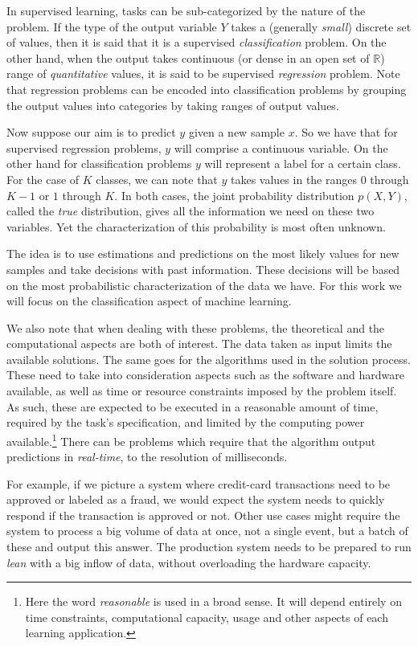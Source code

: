 In supervised learning, tasks can be sub-categorized by the nature of the problem.
If the type of the output variable $Y$ takes a (generally \textit{small}) discrete set of values, then it is said that it is a supervised \textit{classification} problem.
On the other hand, when the output takes continuous (or dense in an open set of $\mathbb{R}$) range of \textit{quantitative} values, it is said to be supervised \textit{regression} problem.
Note that regression problems can be encoded into classification problems by grouping the output values into categories by taking ranges of output values.

Now suppose our aim is to predict $y$ given a new sample $x$.
So we have that for supervised regression problems, $y$ will comprise a continuous variable.
On the other hand for classification problems $y$ will represent a label for a certain class.
For the case of $K$ classes, we can note that $y$ takes values in the ranges $0$ through $K-1$ or $1$ through $K$.
In both cases, the joint probability distribution $p(X, Y)$, called the \textit{true} distribution, gives all the information we need on these two variables.
Yet the characterization of this probability is most often unknown.

The idea is to use estimations and predictions on the most likely values for new samples and take decisions with past information.
These decisions will be based on the most probabilistic characterization of the data we have.
For this work we will focus on the classification aspect of machine learning.

We also note that when dealing with these problems, the theoretical and the computational aspects are both of interest.
The data taken as input limits the available solutions.
The same goes for the algorithms used in the solution process.
These need to take into consideration aspects such as the software and hardware available, as well as time or resource constraints imposed by the problem itself.
As such, these are expected to be executed in a reasonable amount of time, required by the task's specification, and limited by the computing power available.\footnote{Here the word \textit{reasonable} is used in a broad sense.
It will depend entirely on time constraints, computational capacity, usage and other aspects of each learning application.} There can be problems which require that the algorithm output predictions in \textit{real-time}, to the resolution of milliseconds.

For example, if we picture a system where credit-card transactions need to be approved or labeled as a fraud, we would expect the system needs to quickly respond if the transaction is approved or not.
Other use cases might require the system to process a big volume of data at once, not a single event, but a batch of these and output this answer.
The production system needs to be prepared to run \textit{lean} with a big inflow of data, without overloading the hardware capacity.

